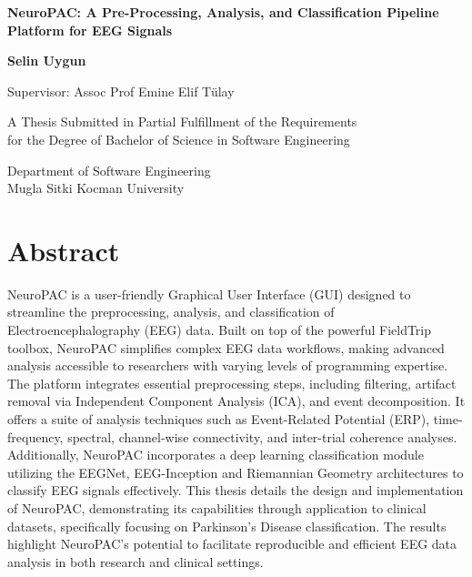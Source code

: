 \documentclass[12pt]{report}
\begin{document}
\begin{titlepage}
    \centering
    \vspace*{1cm}
    \Huge
    \textbf{NeuroPAC: A Pre-Processing, Analysis, and Classification Pipeline Platform for EEG Signals}

    \vspace{1.5cm}
    \Large
    \textbf{Selin Uygun}

    \vspace{1cm}

    \large
    Supervisor: Assoc Prof Emine Elif Tülay

    \vfill

    A Thesis Submitted in Partial Fulfillment of the Requirements\\
    for the Degree of Bachelor of Science in Software Engineering

    \vspace{0.8cm}

    \Large
    Department of Software Engineering\\
    Mugla Sitki Kocman University\\

\end{titlepage}

\chapter*{Abstract}
\setcounter{page}{3} %
NeuroPAC is a user-friendly Graphical User Interface (GUI) designed to streamline the preprocessing, analysis, and classification of Electroencephalography (EEG) data. Built on top of the powerful FieldTrip toolbox, NeuroPAC simplifies complex EEG data workflows, making advanced analysis accessible to researchers with varying levels of programming expertise. The platform integrates essential preprocessing steps, including filtering, artifact removal via Independent Component Analysis (ICA), and event decomposition. It offers a suite of analysis techniques such as Event-Related Potential (ERP), time-frequency, spectral, channel-wise connectivity, and inter-trial coherence analyses. Additionally, NeuroPAC incorporates a deep learning classification module utilizing the EEGNet, EEG-Inception and Riemannian Geometry architectures to classify EEG signals effectively. This thesis details the design and implementation of NeuroPAC, demonstrating its capabilities through application to clinical datasets, specifically focusing on Parkinson's Disease classification. The results highlight NeuroPAC's potential to facilitate reproducible and efficient EEG data analysis in both research and clinical settings.
\end{document}
